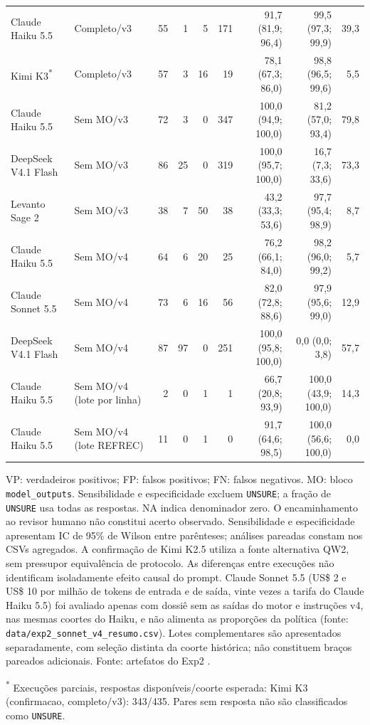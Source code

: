 \begin{table}[!ht]
{\begin{tabular}{llrrrrrrr}
Claude Haiku 5.5 & Completo/v3 & 55 & 1 & 5 & 171 & 91,7 (81,9; 96,4) & 99,5 (97,3; 99,9) & 39,3 \\
Kimi K3\textsuperscript{*} & Completo/v3 & 57 & 3 & 16 & 19 & 78,1 (67,3; 86,0) & 98,8 (96,5; 99,6) & 5,5 \\
Claude Haiku 5.5 & Sem MO/v3 & 72 & 3 & 0 & 347 & 100,0 (94,9; 100,0) & 81,2 (57,0; 93,4) & 79,8 \\
DeepSeek V4.1 Flash & Sem MO/v3 & 86 & 25 & 0 & 319 & 100,0 (95,7; 100,0) & 16,7 (7,3; 33,6) & 73,3 \\
Levanto Sage 2 & Sem MO/v3 & 38 & 7 & 50 & 38 & 43,2 (33,3; 53,6) & 97,7 (95,4; 98,9) & 8,7 \\
Claude Haiku 5.5 & Sem MO/v4 & 64 & 6 & 20 & 25 & 76,2 (66,1; 84,0) & 98,2 (96,0; 99,2) & 5,7 \\
Claude Sonnet 5.5 & Sem MO/v4 & 73 & 6 & 16 & 56 & 82,0 (72,8; 88,6) & 97,9 (95,6; 99,0) & 12,9 \\
DeepSeek V4.1 Flash & Sem MO/v4 & 87 & 97 & 0 & 251 & 100,0 (95,8; 100,0) & 0,0 (0,0; 3,8) & 57,7 \\
Claude Haiku 5.5 & Sem MO/v4 (lote por linha) & 2 & 0 & 1 & 1 & 66,7 (20,8; 93,9) & 100,0 (43,9; 100,0) & 14,3 \\
Claude Haiku 5.5 & Sem MO/v4 (lote REFREC) & 11 & 0 & 1 & 0 & 91,7 (64,6; 98,5) & 100,0 (56,6; 100,0) & 0,0 \\
\bottomrule
\end{tabular}%
}
\par\smallskip
\parbox{\linewidth}{\footnotesize VP: verdadeiros positivos; FP: falsos positivos; FN: falsos negativos. MO: bloco \texttt{model\_outputs}. Sensibilidade e especificidade excluem \texttt{UNSURE}; a fração de \texttt{UNSURE} usa todas as respostas. NA indica denominador zero. O encaminhamento ao revisor humano não constitui acerto observado. Sensibilidade e especificidade apresentam IC de 95\% de Wilson entre parênteses; análises pareadas constam nos CSVs agregados. A confirmação de Kimi K2.5 utiliza a fonte alternativa QW2, sem pressupor equivalência de protocolo. As diferenças entre execuções não identificam isoladamente efeito causal do prompt. Claude Sonnet 5.5 (US\$ 2 e US\$ 10 por milhão de tokens de entrada e de saída, vinte vezes a tarifa do Claude Haiku 5.5) foi avaliado apenas com dossiê sem as saídas do motor e instruções v4, nas mesmas coortes do Haiku, e não alimenta as proporções da política (fonte: \texttt{data/exp2\_sonnet\_v4\_resumo.csv}). Lotes complementares são apresentados separadamente, com seleção distinta da coorte histórica; não constituem braços pareados adicionais. Fonte: artefatos do Exp2 \cite{Jardim2026phdrepo}.}
\par\smallskip
\parbox{\linewidth}{\footnotesize\textsuperscript{*} Execuções parciais, respostas disponíveis/coorte esperada: Kimi K3 (confirmacao, completo/v3): 343/435. Pares sem resposta não são classificados como \texttt{UNSURE}.}
\end{table}
